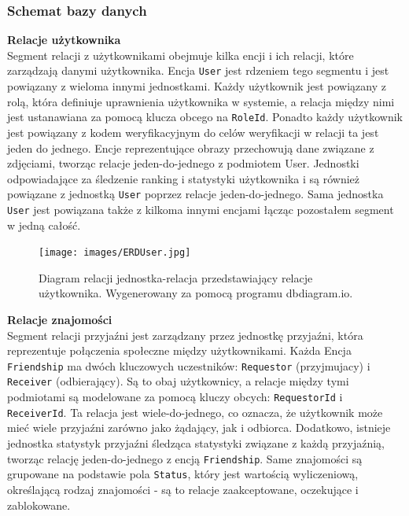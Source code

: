 \documentclass[twoside]{projektInzynierskiMS1}
\begin{document}
\newpage

\subsubsection{Schemat bazy danych}

\noindent \textbf{Relacje użytkownika}\\
Segment relacji z użytkownikami obejmuje kilka encji i ich relacji, które zarządzają danymi użytkownika. Encja \texttt{User} jest rdzeniem tego segmentu i jest powiązany z wieloma innymi jednostkami. Każdy użytkownik jest powiązany z rolą, która definiuje uprawnienia użytkownika w systemie, a relacja między nimi jest ustanawiana za pomocą klucza obcego na \texttt{RoleId}. Ponadto każdy użytkownik jest powiązany z kodem weryfikacyjnym do celów weryfikacji w relacji ta jest jeden do jednego. Encje reprezentujące obrazy przechowują dane związane z zdjęciami, tworząc relacje jeden-do-jednego z podmiotem User. Jednostki odpowiadające za śledzenie ranking i statystyki użytkownika i są również powiązane z jednostką \texttt{User} poprzez relacje jeden-do-jednego. Sama jednostka \texttt{User} jest powiązana także z kilkoma innymi encjami łącząc pozostałem segment w jedną całość.

\vspace{0.5cm}
\begin{figure}[h!]
    \centering
    \texttt{[image: images/ERDUser.jpg]}
    \caption{Diagram relacji jednostka-relacja przedstawiający relacje użytkownika. Wygenerowany za pomocą programu dbdiagram.io.}
\end{figure}

\newpage

\noindent \textbf{Relacje znajomości}\\
Segment relacji przyjaźni jest zarządzany przez jednostkę przyjaźni, która reprezentuje połączenia społeczne między użytkownikami. Każda Encja \texttt{Friendship} ma dwóch kluczowych uczestników: \texttt{Requestor} (przyjmujacy) i \texttt{Receiver} (odbierający). Są to obaj użytkownicy, a relacje między tymi podmiotami są modelowane za pomocą kluczy obcych: \texttt{RequestorId} i \texttt{ReceiverId}. Ta relacja jest wiele-do-jednego, co oznacza, że użytkownik może mieć wiele przyjaźni zarówno jako żądający, jak i odbiorca. Dodatkowo, istnieje jednostka statystyk przyjaźni śledząca statystyki związane z każdą przyjaźnią, tworząc relację jeden-do-jednego z encją \texttt{Friendship}. Same znajomości są grupowane na podstawie pola \texttt{Status}, który jest wartością wyliczeniową, określającą rodzaj znajomości - są to relacje zaakceptowane, oczekujące i zablokowane.
\end{document}
